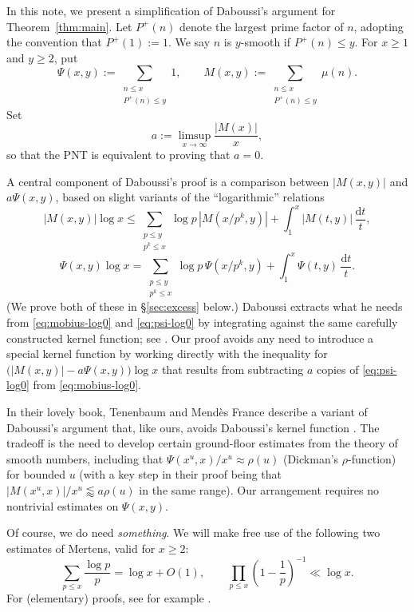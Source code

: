 \documentclass[11pt]{amsart}
\theoremstyle{remark}
\newcommand{\dt}{\,\frac{\mathrm{d}t}{t}}
\begin{document}
In this note, we present a simplification of Daboussi's argument for Theorem~\ref{thm:main}. Let $P^{+}(n)$ denote the largest prime factor of $n$, adopting the convention that $P^{+}(1):=1$. We say $n$ is $y$-smooth if $P^{+}(n)\le y$. For $x\ge1$ and $y\ge 2$, put
\[ \Psi(x,y):=\sum_{\substack{n\le x \\ P^{+}(n)\le y}} 1, \qquad M(x,y):=\sum_{\substack{n\le x \\ P^{+}(n)\le y}} \mu(n).\]
Set \[ a:=\limsup_{x\to\infty}\frac{|M(x)|}{x},\] so that the PNT is equivalent to proving that $a=0$.

A central component of Daboussi's proof is a comparison between $|M(x,y)|$ and $a\Psi(x,y)$, based on slight variants of the ``logarithmic'' relations
\begin{equation}\label{eq:mobius-log0}
|M(x,y)|\log x
\le \sum_{\substack{p\le y\\p^k\le x}}\log p\,|M(x/p^k,y)|
 +\int_1^x |M(t,y)|\dt,
\end{equation}
\begin{equation}\label{eq:psi-log0}
\Psi(x,y)\log x
=\sum_{\substack{p\le y\\p^k\le x}}\log p\,\Psi(x/p^k,y)
 +\int_1^x\Psi(t,y)\dt.
\end{equation}
(We prove both of these in \S\ref{sec:excess} below.)
Daboussi extracts what he needs from \eqref{eq:mobius-log0} and
\eqref{eq:psi-log0} by integrating against the same carefully
constructed kernel function; see \cite[Lemma~2, p.~162, and
\S III.3 and \S IV, pp.~163--164]{daboussi}.
Our proof avoids any need to introduce a special kernel function by working
directly with the inequality for
$\bigl(|M(x,y)|-a\Psi(x,y)\bigr)\log x$ that results from subtracting
$a$ copies of \eqref{eq:psi-log0} from \eqref{eq:mobius-log0}.

In their lovely book, Tenenbaum and Mend\`es France describe a variant of Daboussi's argument that, like ours, avoids Daboussi's kernel function \cite[Chapter~4, \S\S5--7, pp.~92--104]{tmf}. The tradeoff is the need to develop certain ground-floor estimates from the theory of smooth numbers, including that $\Psi(x^u,x)/x^u \approx \rho(u)$ (Dickman's $\rho$-function) for bounded $u$ (with a key step in their proof being that $|M(x^u,x)|/x^u \lessapprox a\rho(u)$ in the same range). Our arrangement requires no nontrivial estimates on $\Psi(x,y)$.

Of course, we do need \emph{something}. We will make free use of the following two estimates of Mertens, valid for $x\ge2$:
\[
\sum_{p\le x}\frac{\log p}{p}=\log x+O(1),\qquad
\prod_{p\le x}\left(1-\frac1p\right)^{-1}\ll\log x.
\]
For (elementary) proofs, see for example \cite[Chapter~9]{shapiro}. 
\end{document}
